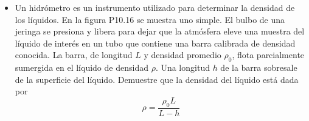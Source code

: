 \documentclass[11pt,a4paper]{article}
\begin{document}
\begin{itemize}
    \item[\textbf{16.}] Un hidrómetro es un instrumento utilizado para determinar la densidad de los líquidos. En la figura P10.16 se muestra uno simple. El bulbo de una jeringa se presiona y libera para dejar que la atmósfera eleve una muestra del líquido de interés en un tubo que contiene una barra calibrada de densidad conocida. La barra, de longitud \(L\) y densidad promedio \(\rho_0\), flota parcialmente sumergida en el líquido de densidad \(\rho\). Una longitud \(h\) de la barra sobresale de la superficie del líquido. Demuestre que la densidad del líquido está dada por
    \[
    \rho = \frac{\rho_0 L}{L - h}
    \]
    
    \vspace*{7cm}
\end{itemize}

\newpage
\end{document}
